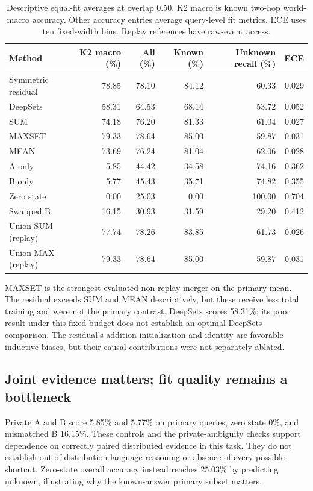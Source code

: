 \documentclass[10pt]{article}
\begin{document}
\begin{table}[ht]
\centering\small
\begin{tabular}{lrrrrr}\toprule
Method & K2 macro (\%) & All (\%) & Known (\%) & Unknown recall (\%) & ECE\\\midrule
Symmetric residual & 78.85 & 78.10 & 84.12 & 60.33 & 0.029 \\
DeepSets & 58.31 & 64.53 & 68.14 & 53.72 & 0.052 \\
SUM & 74.18 & 76.20 & 81.33 & 61.04 & 0.027 \\
MAXSET & 79.33 & 78.64 & 85.00 & 59.87 & 0.031 \\
MEAN & 73.69 & 76.24 & 81.04 & 62.06 & 0.028 \\
A only & 5.85 & 44.42 & 34.58 & 74.16 & 0.362 \\
B only & 5.77 & 45.43 & 35.71 & 74.82 & 0.355 \\
Zero state & 0.00 & 25.03 & 0.00 & 100.00 & 0.704 \\
Swapped B & 16.15 & 30.93 & 31.59 & 29.20 & 0.412 \\
Union SUM (replay) & 77.74 & 78.26 & 83.85 & 61.73 & 0.026 \\
Union MAX (replay) & 79.33 & 78.64 & 85.00 & 59.87 & 0.031 \\
\bottomrule\end{tabular}
\caption{Descriptive equal-fit averages at overlap 0.50. K2 macro is known
two-hop world-macro accuracy. Other accuracy entries average query-level fit
metrics. ECE uses ten fixed-width bins. Replay references have raw-event access.}
\label{tab:methods}
\end{table}

MAXSET is the strongest evaluated non-replay merger on the primary mean.
The residual exceeds SUM and MEAN descriptively, but these receive less total
training and were not the primary contrast. DeepSets scores 58.31\%; its poor
result under this fixed budget does not establish an optimal DeepSets comparison.
The residual's addition initialization and identity are favorable inductive
biases, but their causal contributions were not separately ablated.

\subsection{Joint evidence matters; fit quality remains a bottleneck}
Private A and B score 5.85\% and 5.77\% on primary queries, zero state 0\%,
and mismatched B 16.15\%. These controls and the private-ambiguity checks
support dependence on correctly paired distributed evidence in this task.
They do not establish out-of-distribution language reasoning or absence of
every possible shortcut. Zero-state overall accuracy instead reaches 25.03\%
by predicting unknown, illustrating why the known-answer primary subset matters.
\end{document}
